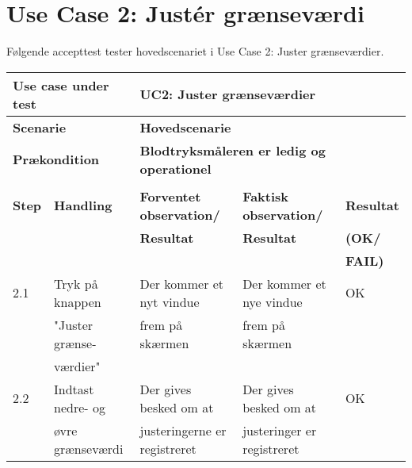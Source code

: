 \section{Use Case 2: Justér grænseværdi}
\vspace{0.3cm}
Følgende accepttest tester hovedscenariet i Use Case 2: Juster grænseværdier. 

\begin{table}[h!]
	\begin{tabular}{lllll}
		\multicolumn{2}{l|}{\textbf{Use case under test}} & \multicolumn{3}{l}{\textbf{UC2: Juster grænseværdier}} \\ \hline
		\multicolumn{2}{l|}{\textbf{Scenarie}} & \multicolumn{3}{l}{\textbf{Hovedscenarie}} \\ \hline
		\multicolumn{2}{l|}{\textbf{Prækondition}} & \multicolumn{3}{l}{\textbf{Blodtryksmåleren er ledig og operationel}} \\ \hline
		\multicolumn{5}{l}{\cellcolor[HTML]{187ABD}{\color[HTML]{187ABD} }} \\ \hline
		\multicolumn{1}{l|}{\textbf{Step}} & \multicolumn{1}{l|}{\textbf{Handling}} & \multicolumn{1}{l|}{\textbf{Forventet observation/}} & \multicolumn{1}{l|}{\textbf{Faktisk observation/}} & \textbf{Resultat} \\
		\multicolumn{1}{l|}{} & \multicolumn{1}{l|}{} & \multicolumn{1}{l|}{\textbf{Resultat}} & \multicolumn{1}{l|}{\textbf{Resultat}} & \textbf{(OK/} \\
		\multicolumn{1}{l|}{} & \multicolumn{1}{l|}{} & \multicolumn{1}{l|}{\textbf{}} & \multicolumn{1}{l|}{\textbf{}} & \textbf{FAIL)} \\ \hline
		\multicolumn{1}{l|}{2.1} & \multicolumn{1}{l|}{Tryk på knappen} & \multicolumn{1}{l|}{Der kommer et nyt vindue} & \multicolumn{1}{l|}{Der kommer et nye vindue} & OK \\
		\multicolumn{1}{l|}{} & \multicolumn{1}{l|}{"Juster grænse-} & \multicolumn{1}{l|}{frem på skærmen} & \multicolumn{1}{l|}{frem på skærmen} &  \\
		\multicolumn{1}{l|}{} & \multicolumn{1}{l|}{værdier"} & \multicolumn{1}{l|}{} & \multicolumn{1}{l|}{} &  \\ \hline
		\multicolumn{1}{l|}{2.2} & \multicolumn{1}{l|}{Indtast nedre- og} & \multicolumn{1}{l|}{Der gives besked om at} & \multicolumn{1}{l|}{Der gives besked om at} & OK \\
		\multicolumn{1}{l|}{} & \multicolumn{1}{l|}{øvre grænseværdi} & \multicolumn{1}{l|}{justeringerne er registreret} & \multicolumn{1}{l|}{justeringer er registreret} &  \\

\end{tabular}
\end{table}
